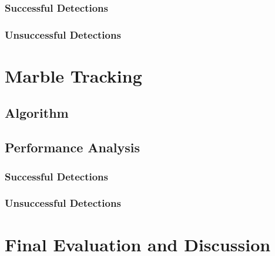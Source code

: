 \documentclass[10pt,a4paper,twocolumn]{report}
\begin{document}
\subsection{Successful Detections}

\subsection{Unsuccessful Detections}

\chapter{Marble Tracking}

\section{Algorithm}


\section{Performance Analysis}

\subsection{Successful Detections}

\subsection{Unsuccessful Detections}

\chapter{Final Evaluation and Discussion}
\end{document}
